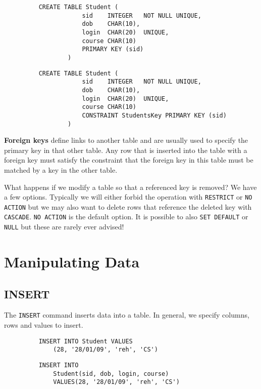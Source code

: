 \documentclass{article}
\begin{document}
	\begin{figure}[h]
		\begin{minipage}[t]{0.45\textwidth}
			\begin{verbatim}
	CREATE TABLE Student (
			    sid    INTEGER   NOT NULL UNIQUE,
			    dob    CHAR(10),
			    login  CHAR(20)  UNIQUE,
			    course CHAR(10)
			    PRIMARY KEY (sid)
			)
	\end{verbatim}
		\end{minipage}
		\hfill
		\begin{minipage}[t]{0.45\textwidth}
			\begin{verbatim}
	CREATE TABLE Student (
			    sid    INTEGER   NOT NULL UNIQUE,
			    dob    CHAR(10),
			    login  CHAR(20)  UNIQUE,
			    course CHAR(10)
			    CONSTRAINT StudentsKey PRIMARY KEY (sid)
			)
	\end{verbatim}
		\end{minipage}
	\end{figure}
	
	
	\par 
	\textbf{Foreign keys} define links to another table and are usually used to specify the primary key in that other table. Any row that is inserted into the table with a foreign key must satisfy the constraint that the foreign key in this table must be matched by a key in the other table.
	
	\par 
	What happens if we modify a table so that a referenced key is removed? We have a few options. Typically we will either forbid the operation with \texttt{RESTRICT} or \texttt{NO ACTION} but we may also want to delete rows that reference the deleted key with \texttt{CASCADE}. \texttt{NO ACTION} is the default option. It is possible to also \texttt{SET DEFAULT} or \texttt{NULL} but these are rarely ever advised! 
	
	\section{Manipulating Data}
	\subsection{INSERT}
	The \texttt{INSERT} command inserts data into a table. In general, we specify columns, rows and values to insert. 
	
\begin{figure}[h]
		\begin{minipage}[t]{0.45\textwidth}
			\begin{verbatim}
	INSERT INTO Student VALUES
	    (28, '28/01/09', 'reh', 'CS')
	\end{verbatim}
		\end{minipage}
		\hfill
		\begin{minipage}[t]{0.45\textwidth}
			\begin{verbatim}
	INSERT INTO 
	    Student(sid, dob, login, course)
	    VALUES(28, '28/01/09', 'reh', 'CS')
	\end{verbatim}
		\end{minipage}
	\end{figure}	
\end{document}
